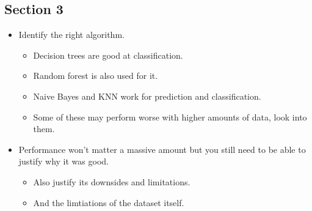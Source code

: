 \documentclass[12pt]{report}
\begin{document}
\subsection{Section 3}
\begin{itemize}
    \item Identify the right algorithm. \begin{itemize}
        \item Decision trees are good at classification.
        \item Random forest is also used for it.
        \item Naive Bayes and KNN work for prediction and classification.
        \item Some of these may perform worse with higher amounts of data, look into them.
    \end{itemize}
    \item Performance won't matter a massive amount but you still need to be able to justify why it was good.
    \begin{itemize}
        \item Also justify its downsides and limitations.
        \item And the limtiations of the dataset itself.
    \end{itemize}
\end{itemize}
\end{document}
